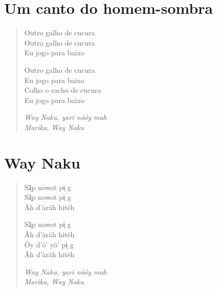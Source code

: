 \endgroup

\chapter{Um canto do homem-sombra}

\begin{verse}
Outro galho de cucura\\
Outro galho de cucura\\
Eu jogo para baixo

Outro galho de cucura\\
Eu jogo para baixo\\
Colho o cacho de cucura\\
Eu jogo para baixo

\textit{Way Naku, yari nóóy mah\\
Marika, Way Naku}
\end{verse}

\chapter{Way Naku}

\begin{verse}
Sã̗p nowot pɨ̗ g\\
Sã̗p nowot pɨ̗ g\\
Ãh d’äräh hitëh

Sã̗p nowot pɨ̗ g\\
Ãh d’äräh hitëh\\
Öy d’ö’ yö’ pɨ̗ g\\
Ãh d’äräh hitëh

\textit{Way Naku, yari nóóy mah\\
Marika, Way Naku}
\end{verse}


